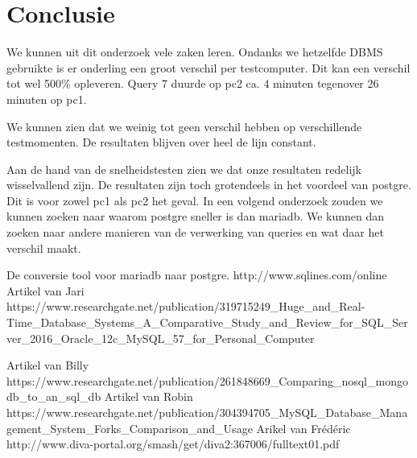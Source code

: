 \documentclass[fleqn,10pt]{artikeltin}
\begin{document}
\section{Conclusie}
\label{sec:conclusie}

We kunnen uit dit onderzoek vele zaken leren. Ondanks we hetzelfde DBMS gebruikte is er onderling een groot verschil per testcomputer. Dit kan een verschil tot wel 500\% opleveren. Query 7 duurde op pc2 ca. 4 minuten tegenover 26 minuten op pc1.

We kunnen zien dat we weinig tot geen verschil hebben op verschillende testmomenten. De resultaten blijven over heel de lijn constant.

 Aan de hand van de snelheidstesten zien we dat onze resultaten redelijk wisselvallend zijn. De resultaten zijn toch grotendeels in het voordeel van postgre. Dit is voor zowel pc1 als pc2 het geval. In een volgend onderzoek zouden we kunnen zoeken naar waarom postgre sneller is dan mariadb. We kunnen dan zoeken naar andere manieren van de verwerking van queries en wat daar het verschil maakt.

 




\begin{thebibliography}{8}
    
   De conversie tool voor mariadb naar postgre.
   http://www.sqlines.com/online
    Artikel van Jari\\
https://www.researchgate.net/publication/319715249\_Huge\_and\_Real-Time\_Database\_Systems\_A\_Comparative\_Study\_and\_Review\_for\_SQL\_Server\_2016\_Oracle\_12c\_MySQL\_57\_for\_Personal\_Computer
       
    Artikel van Billy\\
   https://www.researchgate.net/publication/261848669\_Comparing\_nosql\_mongodb\_to\_an\_sql\_db
    Artikel van Robin\\
    https://www.researchgate.net/publication/304394705\_MySQL\_Database\_Management\_System\_Forks\_Comparison\_and\_Usage
Arikel van Frédéric \\
http://www.diva-portal.org/smash/get/diva2:367006/fulltext01.pdf
\end{thebibliography}
\end{document}
